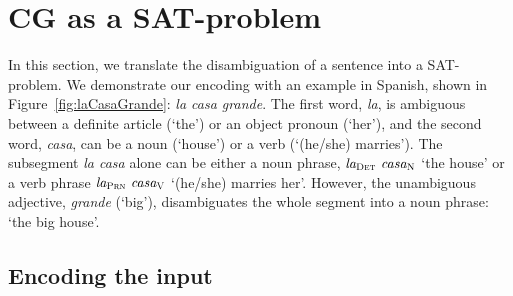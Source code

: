 

\section{CG as a SAT-problem}
\label{sec:CGSAT}

In this section, we translate the disambiguation of a sentence into a SAT-problem.
We demonstrate our encoding with an example in Spanish, shown in
Figure~\ref{fig:laCasaGrande}: {\em la casa grande}. %
The first word, {\em la}, is ambiguous between a definite article
(`the') or an object pronoun (`her'), and the second word, {\em casa},
can be a noun (`house') or a verb (`(he/she) marries'). 
The subsegment {\em la casa} alone can be either a noun phrase, $\text{\em la}_{\text{\sc Det}} \ \text{\em casa}_{\text{\sc N}}$ 
`the house'  or a verb phrase $\text{\em la}_{\text{\sc Prn}} \ \text{\em casa}_{\text{\sc V}}$   `(he/she) marries her'. 
However, the unambiguous adjective, {\em grande} (`big'),
disambiguates the whole segment into a noun phrase: `the big house'.
%



\subsection{Encoding the input}

